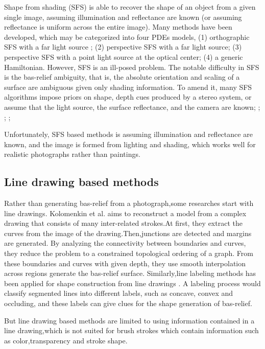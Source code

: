 Shape from shading (SFS) is able to recover the shape of an object from a given single image, assuming illumination and reflectance are known (or assuming reflectance is uniform across the entire image). Many methods have been developed, which may be categorized into four PDEs models\cite{prados2003perspective}, (1) orthographic SFS with a far light source \cite{lions1993shape}; (2) perspective SFS with a far light source\cite{prados2004unifying}; (3) perspective SFS with a point light source at the optical center\cite{prados2003perspective}; (4) a generic Hamiltonian. However, SFS is an ill-posed problem. The notable difficulty in SFS is the bas-relief ambiguity\cite{belhumeur1999bas}, that is, the absolute orientation and scaling of a surface are ambiguous given only shading information. To amend it, many SFS algorithms impose priors on shape, depth cues produced by a stereo system, or assume that the light source, the surface reflectance, and the camera are known\cite{zhang1999shape}; \cite{alldrin2007resolving}; \cite{johnson2011shape}; \cite{barron2012color}; 

Unfortunately, SFS based methods is assuming illumination and reflectance are known, and the image is formed from lighting and shading, which works well for realistic photographs rather than paintings. 

\subsection{Line drawing based methods}
Rather than generating bas-relief from a photograph,some researches start with line drawings.
Kolomenkin et al.\cite{kolomenkin2011reconstruction}  aims to reconstruct a model from a complex drawing that consists of many inter-related strokes.At first, they extract the curves from the image of the drawing.Then,junctions are detected and margins are generated. By analyzing the connectivity between boundaries and curves, they reduce the problem to a constrained topological ordering of a graph. From these boundaries and curves with given depth, they use smooth interpolation across regions generate the bas-relief surface. Similarly,line labeling methods has been applied for shape construction from line drawings  \cite{varley2002estimating}\cite{malik1987interpreting}\cite{sykora2014ink}. A labeling process would classify segmented lines into different labels, such as concave, convex and occluding, and these labels can give clues for the shape generation of bas-relief. 

But line drawing based methods are limited to using information contained in a line drawing,which is not suited for brush strokes which contain information such as color,transparency and stroke shape. 

\newpage
